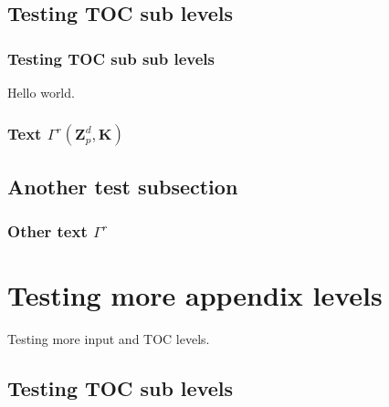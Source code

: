 \subsection{Testing TOC sub levels}

\subsubsection{Testing TOC sub sub levels}
Hello world.

\subsubsection{Text $\Gamma^{r}(\ensuremath{{\mathbf{Z}}}_p^d,\mathbf{K})$}

\subsection{Another test subsection}

\subsubsection{Other text $\Gamma^{r}$}

\section{Testing more appendix levels}
Testing more input and TOC levels.

\subsection{Testing TOC sub levels}

